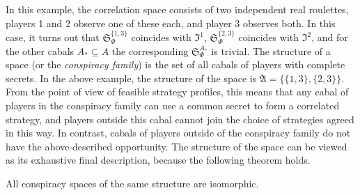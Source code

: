 In this example, the correlation space consists of two independent real roulettes, players 1 and 2 observe one of these each, and player 3 observes both. In this case, it turns out that $\mathfrak{S}_\Phi^{\{1,3\}}$ coincides with $\mathfrak{I}^1$, $\mathfrak{S}_\Phi^{\{2,3\}}$ coincides with $\mathfrak{I}^2$, and for the other cabals $A_* \subseteq A$ the corresponding $\mathfrak{S}_\Phi^{A_*}$ is trivial. The structure of a space (or the \emph{conspiracy family}) is the set of all cabals of players with complete secrets. In the above example, the structure of the space is $\mathfrak{A} = \{\{1,3\},\{2,3\}\}$. From the point of view of feasible strategy profiles, this means that any cabal of players in the conspiracy family can use a common secret to form a correlated strategy, and players outside this cabal cannot join the choice of strategies agreed in this way. In contrast, cabals of players outside of the conspiracy family do not have the above-described opportunity. The structure of the space can be viewed as its exhaustive final description, because the following theorem holds. %
\begin{theorem} \label{the:struct}
	All conspiracy spaces of the same structure are isomorphic. %
\end{theorem}

